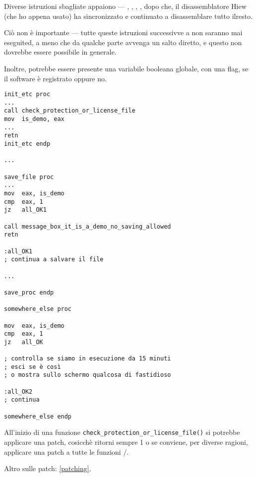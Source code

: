 Diverse istruzioni sbagliate appaiono --- , , , ,
dopo che, il disassemblatore Hiew (che ho appena usato) ha sincronizzato e continuato a disassemblare tutto ilresto.

Ciò non è importante --- tutte queste istruzioni successivve a  non saranno mai eseguited,
a meno che da qualche parte avvenga un salto diretto, e questo non dovrebbe essere possibile in generale.

\myhrule{}

Inoltre, potrebbe essere presente una variabile booleana globale, con una flag, se il software è registrato oppure no.

\begin{lstlisting}[style=customasmx86]
init_etc proc
...
call check_protection_or_license_file
mov  is_demo, eax
...
retn
init_etc endp

...

save_file proc
...
mov  eax, is_demo
cmp  eax, 1
jz   all_OK1

call message_box_it_is_a_demo_no_saving_allowed
retn

:all_OK1
; continua a salvare il file

...

save_proc endp

somewhere_else proc

mov  eax, is_demo
cmp  eax, 1
jz   all_OK

; controlla se siamo in esecuzione da 15 minuti
; esci se è così
; o mostra sullo schermo qualcosa di fastidioso 

:all_OK2
; continua

somewhere_else endp
\end{lstlisting}

All'inizio di una funzione \verb|check_protection_or_license_file()| si potrebbe applicare una patch, cosicchè ritorni sempre 1 o se conviene, per diverse ragioni, applicare una patch a tutte le funzioni /.

Altro sulle patch: \ref{patching}.

